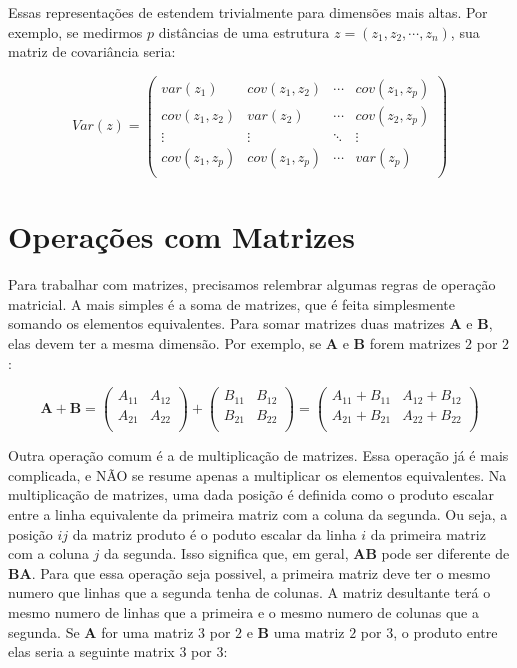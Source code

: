 \documentclass[portuges,]{tufte-handout}
\begin{document}
Essas representações de estendem trivialmente para dimensões mais altas.
Por exemplo, se medirmos $p$ distâncias de uma estrutura
$z = (z_1, z_2, \cdots, z_n)$, sua matriz de covariância seria:

\[
Var(z) = \left (
\begin{matrix}
var(z_1) & cov(z_1, z_2) & \cdots & cov(z_1, z_p) \\
cov(z_1, z_2) & var(z_2) & \cdots & cov(z_2, z_p) \\
\vdots & \vdots  & \ddots & \vdots                \\
cov(z_1, z_p) & cov(z_1, z_p) & \cdots & var(z_p) \\
\end{matrix}
\right )
\]

\section{Operações com Matrizes}\label{operauxe7uxf5es-com-matrizes}

Para trabalhar com matrizes, precisamos relembrar algumas regras de
operação matricial. A mais simples é a soma de matrizes, que é feita
simplesmente somando os elementos equivalentes. Para somar matrizes duas
matrizes $\mathbf{A}$ e $\mathbf{B}$, elas devem ter a mesma dimensão.
Por exemplo, se $\mathbf{A}$ e $\mathbf{B}$ forem matrizes $2$ por $2$:

\[
\mathbf{A} + \mathbf{B} =
\left (
\begin{matrix}
A_{11} & A_{12}\\
A_{21} & A_{22}  \\
\end{matrix}
\right )
+
\left (
\begin{matrix}
B_{11} & B_{12}\\
B_{21} & B_{22}  \\
\end{matrix}
\right )
=
 \left (
\begin{matrix}
A_{11}+B_{11} & A_{12}+B_{12}\\
A_{21}+B_{21} & A_{22}+B_{22} \\
\end{matrix}
\right )
\]

Outra operação comum é a de multiplicação de matrizes. Essa operação já
é mais complicada, e NÃO se resume apenas a multiplicar os elementos
equivalentes. Na multiplicação de matrizes, uma dada posição é definida
como o produto escalar entre a linha equivalente da primeira matriz com
a coluna da segunda. Ou seja, a posição $ij$ da matriz produto é o
poduto escalar da linha $i$ da primeira matriz com a coluna $j$ da
segunda. Isso significa que, em geral, $\mathbf{A}\mathbf{B}$ pode ser
diferente de $\mathbf{B}\mathbf{A}$. Para que essa operação seja
possivel, a primeira matriz deve ter o mesmo numero que linhas que a
segunda tenha de colunas. A matriz desultante terá o mesmo numero de
linhas que a primeira e o mesmo numero de colunas que a segunda. Se
$\mathbf{A}$ for uma matriz $3$ por $2$ e $\mathbf{B}$ uma matriz $2$
por $3$, o produto entre elas seria a seguinte matrix $3$ por $3$:
\end{document}
